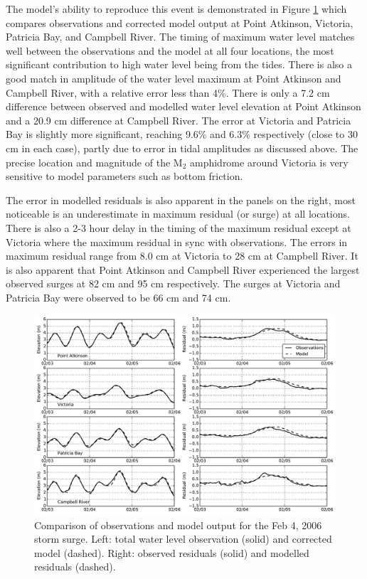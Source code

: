 \documentclass[pdftex,10pt]{article}
\begin{document}
The model's ability to reproduce this event is demonstrated in Figure \ref{fig:feb2006} which compares observations and corrected model output at Point Atkinson, Victoria, Patricia Bay, and Campbell River. The timing of maximum water level matches well between the observations and the model at all four locations, the most significant contribution to high water level being from the tides. There is also a good match in amplitude of the water level maximum at Point Atkinson and Campbell River, with a relative error less than 4\%. There is only a 7.2 cm difference between observed and modelled water level elevation at Point Atkinson and a 20.9 cm difference at Campbell River. The error at Victoria and Patricia Bay is slightly more significant, reaching 9.6\% and 6.3\% respectively (close to 30 cm in each case), partly due to error in tidal amplitudes as discussed above. The precise location and magnitude of the M$_2$ amphidrome around Victoria is very sensitive to model parameters such as bottom friction. 

The error in modelled residuals is also apparent in the panels on the right, most noticeable is an underestimate in maximum residual (or surge) at all locations. There is also a 2-3 hour delay in the timing of the maximum residual except at Victoria where the maximum residual in sync with observations. The errors in maximum residual range from 8.0 cm at Victoria to 28 cm at Campbell River. It is also apparent that Point Atkinson and Campbell River experienced the largest observed surges at 82 cm and 95 cm respectively. The surges at Victoria and Patricia Bay were observed to be 66 cm and 74 cm. 


\begin{figure}
\centering
\includegraphics[scale=0.6]{Figures/feb2006.pdf}
\caption{Comparison of observations and model output for the Feb 4, 2006 storm surge. Left: total water level observation (solid) and corrected model (dashed). Right: observed residuals (solid) and modelled residuals (dashed).}
\label{fig:feb2006}
\end{figure}
\end{document}
